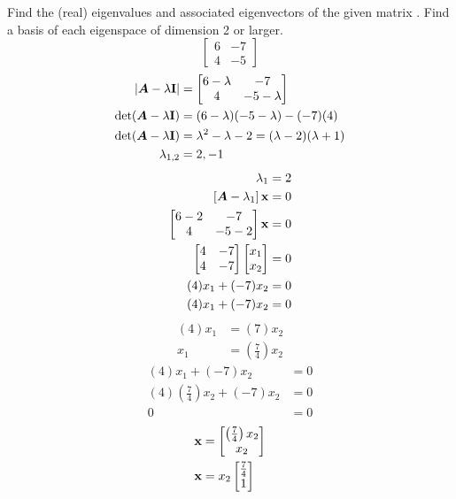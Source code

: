 \documentclass{article}
\begin{document}
Find the (real) eigenvalues and associated eigenvectors of the given matrix . Find a basis of each eigenspace of dimension 2 or larger.
\begin{equation*}
	\begin{bmatrix}
		6 & -7 \\
		4 & -5
	\end{bmatrix}
\end{equation*}
\begin{align*}
	\left| \matr{A} - \lambda \vect{I} \right| & =
		\begin{bmatrix}
			6 - \lambda & -7 \\
			4 & -5 - \lambda
		\end{bmatrix} \\
	\det( \matr{A} - \lambda \vect{I} ) & = (6 - \lambda)(-5 - \lambda) - (-7)(4) \\
	\det( \matr{A} - \lambda \vect{I} ) & = \lambda^2 - \lambda - 2 = (\lambda - 2)(\lambda + 1) \\
	\lambda_{1,2} & = 2, -1
\end{align*}
\begin{align*}
	\lambda_1 & = 2 \\
	\left[ \matr{A} - \lambda_1 \right] \vect{x} & = 0 \\
	\begin{bmatrix}
		6 - 2 & -7 \\
		4 & -5 - 2
	\end{bmatrix} \vect{x} & = 0 \\
	\begin{bmatrix}
		4 & -7 \\
		4 & -7
	\end{bmatrix}
	\begin{bmatrix}
		x_1 \\
		x_2
	\end{bmatrix} & = 0 \\
	(4)x_1 + (-7)x_2 & = 0 \\
	(4)x_1 + (-7)x_2 & = 0
\end{align*}
\begin{align*}
	(4)x_1 & = (7)x_2 \\
	x_1 & = \left( \frac{7}{4} \right) x_2
\end{align*}
\begin{align*}
	(4)x_1 + (-7)x_2 & = 0 \\
	(4)\left( \frac{7}{4} \right) x_2 + (-7)x_2 & = 0 \\
	0 & = 0
\end{align*}
\begin{align*}
	\vect{x} & = \begin{bmatrix} \left( \frac{7}{4} \right) x_2 \\ x_2 \end{bmatrix} \\
	\vect{x} & = x_2 \begin{bmatrix} \frac{7}{4} \\ 1 \end{bmatrix}
\end{align*}
\end{document}
